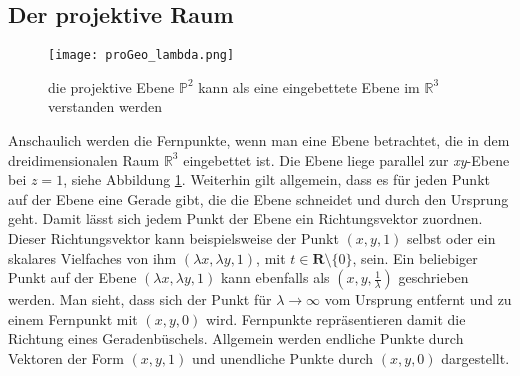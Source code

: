 \subsection{Der projektive Raum}
\begin{figure}[htb]
\centering
\texttt{[image: proGeo\_lambda.png]}
\caption{die projektive Ebene ${\mathbb{P}}^{2}$ kann als eine eingebettete Ebene im ${\mathbb{R}}^{3}$ verstanden werden \cite{Wahner2011}} 
\label{fig:progeo}
\end{figure} 
Anschaulich werden die Fernpunkte, wenn man eine Ebene betrachtet, die in dem dreidimensionalen Raum ${\mathbb{R}}^{3}$ eingebettet ist. Die Ebene liege parallel zur \textit{xy}-Ebene bei $z = 1$, siehe Abbildung \ref{fig:progeo}. Weiterhin gilt allgemein, dass es für jeden Punkt auf der Ebene eine Gerade gibt, die die Ebene schneidet und durch den Ursprung geht. Damit l\"asst sich jedem Punkt der Ebene ein Richtungsvektor zuordnen. Dieser Richtungsvektor kann beispielsweise der Punkt $(x,y,1)$ selbst oder ein skalares Vielfaches von ihm $(\lambda x,\lambda y,1)$, mit $t \in \textbf{R} \setminus \{0\}$, sein. 
Ein beliebiger Punkt auf der Ebene $(\lambda x,\lambda y,1)$ kann ebenfalls als $(x,y,\frac{1}{\lambda})$ geschrieben werden. Man sieht, dass sich der Punkt für $\lambda \to \infty$ vom Ursprung entfernt und zu einem Fernpunkt mit $(x,y,0)$ wird. Fernpunkte repr\"asentieren damit die Richtung eines Geradenbüschels\cite{Wahner2011}. Allgemein werden endliche Punkte durch Vektoren der Form $(x,y,1)$ und unendliche Punkte durch $(x,y,0)$ dargestellt.

